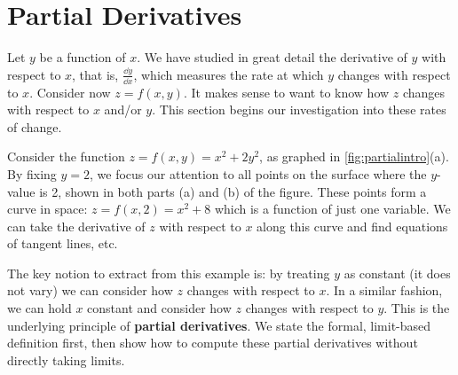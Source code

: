 \section{Partial Derivatives}\label{sec:partial_derivatives}

Let $y$ be a function of $x$. We have studied in great detail the derivative of $y$ with respect to $x$, that is, $\frac{\dd y}{\dd x}$, which measures the rate at which $y$ changes with respect to $x$. Consider now $z=f(x,y)$. It makes sense to want to know how $z$ changes with respect to $x$ and/or $y$. This section begins our investigation into these rates of change.


Consider the function $z=f(x,y) = x^2+2y^2$, as graphed in \autoref{fig:partialintro}(a). By fixing $y=2$, we focus our attention to all points on the surface where the $y$-value is 2, shown in both parts (a) and (b) of the figure. These points form a curve in space: $z = f(x,2) = x^2+8$ which is a function of just one variable. We can take the derivative of $z$ with respect to $x$ along this curve and find equations of tangent lines, etc.

The key notion to extract from this example is: by treating $y$ as  constant (it does not vary) we can consider how $z$ changes with respect to $x$. In a similar fashion, we can hold $x$ constant and consider how $z$ changes with respect to $y$. This is the underlying principle of \textbf{partial derivatives}. We state the formal, limit-based definition first, then show how to compute these partial derivatives without directly taking limits.

